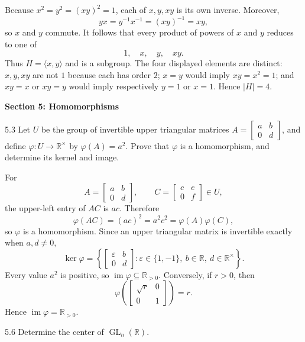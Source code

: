 \documentclass[11pt]{article}
\newcommand{\sectionheading}[1]{%
  \vspace{0.25em}
  {\color{darkgray}\large\bfseries #1}\par
}
\newcommand{\R}{\mathbb{R}}
\newcommand{\GL}{\operatorname{GL}}
\newcommand{\im}{\operatorname{im}}
\begin{document}
\begin{solution}
Because $x^2=y^2=(xy)^2=1$, each of $x,y,xy$ is its own inverse.  Moreover,
\[
  yx=y^{-1}x^{-1}=(xy)^{-1}=xy,
\]
so $x$ and $y$ commute.  It follows that every product of powers of $x$
and $y$ reduces to one of
\[
  1,\quad x,\quad y,\quad xy.
\]
Thus $H=\langle x,y\rangle$ and is a subgroup.  The four displayed
elements are distinct: $x,y,xy$ are not $1$ because each has order $2$;
$x=y$ would imply $xy=x^2=1$; and $xy=x$ or $xy=y$ would imply respectively
$y=1$ or $x=1$.  Hence $|H|=4$.
\end{solution}

\sectionheading{Section 5: Homomorphisms}

\begin{exercise}{5.3}
Let $U$ be the group of invertible upper triangular matrices
$A=\begin{bmatrix}a&b\\0&d\end{bmatrix}$, and define
$\varphi\colon U\to\R^\times$ by $\varphi(A)=a^2$. Prove that $\varphi$
is a homomorphism, and determine its kernel and image.
\end{exercise}

\begin{solution}
For
\[
 A=\begin{bmatrix}a&b\\0&d\end{bmatrix},\qquad
 C=\begin{bmatrix}c&e\\0&f\end{bmatrix}\in U,
\]
the upper-left entry of $AC$ is $ac$.  Therefore
\[
  \varphi(AC)=(ac)^2=a^2c^2=\varphi(A)\varphi(C),
\]
so $\varphi$ is a homomorphism.  Since an upper triangular matrix is
invertible exactly when $a,d\neq0$,
\[
 \ker\varphi
 =\left\{
 \begin{bmatrix}\varepsilon&b\\0&d\end{bmatrix}:
 \varepsilon\in\{1,-1\},\ b\in\R,\ d\in\R^\times
 \right\}.
\]
Every value $a^2$ is positive, so $\im\varphi\subseteq\R_{>0}$.  Conversely,
if $r>0$, then
\[
 \varphi\!\left(\begin{bmatrix}\sqrt r&0\\0&1\end{bmatrix}\right)=r.
\]
Hence $\im\varphi=\R_{>0}$.
\end{solution}

\begin{exercise}{5.6}
Determine the center of $\GL_n(\R)$.
\end{exercise}
\end{document}

